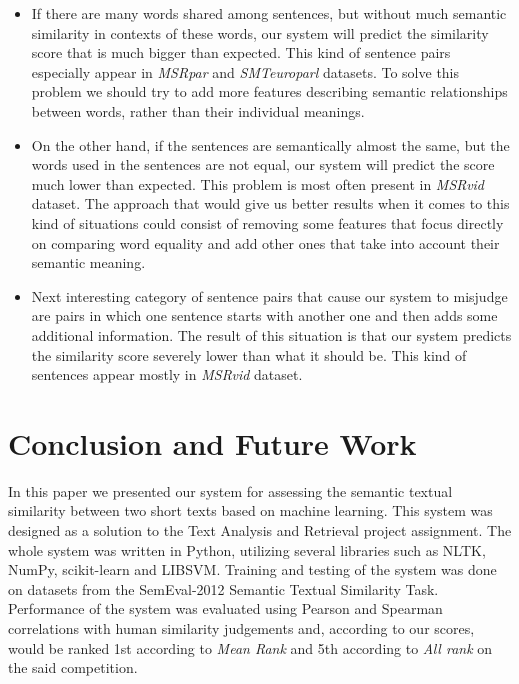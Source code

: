 \documentclass[10pt, a4paper]{article}
\begin{document}
\begin{itemize} \itemsep1pt \parskip0pt 
	\item If there are many words shared among sentences, but without much semantic similarity in contexts of these words, our system will predict the similarity score that is much bigger than expected. This kind of sentence pairs especially appear in \textit{MSRpar} and \textit{SMTeuroparl} datasets. To solve this problem we should try to add more features describing semantic relationships between words, rather than their individual meanings.
	
	\item On the other hand, if the sentences are semantically almost the same, but the words used in the sentences are not equal, our system will predict the score much lower than expected. This problem is most often present in \textit{MSRvid} dataset. The approach that would give us better results when it comes to this kind of situations could consist of removing some features that focus directly on comparing word equality and add other ones that take into account their semantic meaning.
	
	\item Next interesting category of sentence pairs that cause our system to misjudge are pairs in which one sentence starts with another one and then adds some additional information. The result of this situation is that our system predicts the similarity score  severely lower than what it should be. This kind of sentences appear mostly in \textit{MSRvid} dataset.
\end{itemize}

\section{Conclusion and Future Work}

In this paper we presented our system for assessing the semantic textual similarity between two short texts based on machine learning. This system was designed as a solution to the Text Analysis and Retrieval project assignment. The whole system was written in Python, utilizing several libraries such as NLTK, NumPy, scikit-learn and LIBSVM. Training and testing of the system was done on datasets from the SemEval-2012 Semantic Textual Similarity Task. Performance of the system was evaluated using Pearson and Spearman correlations with human similarity judgements and, according to our scores, would be ranked 1st according to \textit{Mean Rank} and 5th according to \textit{All rank} on the said competition.
\end{document}
